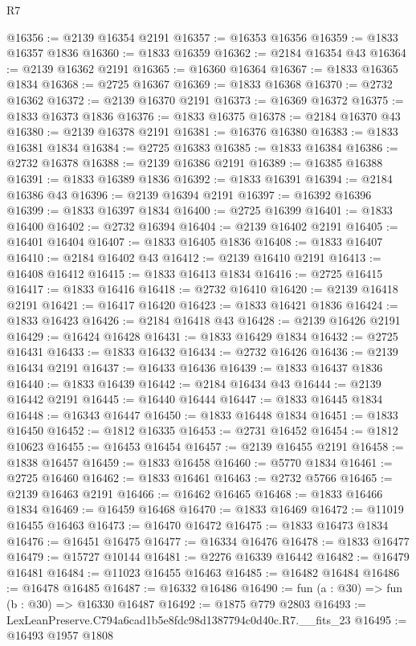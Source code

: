 \begin{lexlean}{R7}
\begin{coremodule}
@16356 := @2139 @16354 @2191
@16357 := @16353 @16356
@16359 := @1833 @16357 @1836
@16360 := @1833 @16359
@16362 := @2184 @16354 @43
@16364 := @2139 @16362 @2191
@16365 := @16360 @16364
@16367 := @1833 @16365 @1834
@16368 := @2725 @16367
@16369 := @1833 @16368
@16370 := @2732 @16362
@16372 := @2139 @16370 @2191
@16373 := @16369 @16372
@16375 := @1833 @16373 @1836
@16376 := @1833 @16375
@16378 := @2184 @16370 @43
@16380 := @2139 @16378 @2191
@16381 := @16376 @16380
@16383 := @1833 @16381 @1834
@16384 := @2725 @16383
@16385 := @1833 @16384
@16386 := @2732 @16378
@16388 := @2139 @16386 @2191
@16389 := @16385 @16388
@16391 := @1833 @16389 @1836
@16392 := @1833 @16391
@16394 := @2184 @16386 @43
@16396 := @2139 @16394 @2191
@16397 := @16392 @16396
@16399 := @1833 @16397 @1834
@16400 := @2725 @16399
@16401 := @1833 @16400
@16402 := @2732 @16394
@16404 := @2139 @16402 @2191
@16405 := @16401 @16404
@16407 := @1833 @16405 @1836
@16408 := @1833 @16407
@16410 := @2184 @16402 @43
@16412 := @2139 @16410 @2191
@16413 := @16408 @16412
@16415 := @1833 @16413 @1834
@16416 := @2725 @16415
@16417 := @1833 @16416
@16418 := @2732 @16410
@16420 := @2139 @16418 @2191
@16421 := @16417 @16420
@16423 := @1833 @16421 @1836
@16424 := @1833 @16423
@16426 := @2184 @16418 @43
@16428 := @2139 @16426 @2191
@16429 := @16424 @16428
@16431 := @1833 @16429 @1834
@16432 := @2725 @16431
@16433 := @1833 @16432
@16434 := @2732 @16426
@16436 := @2139 @16434 @2191
@16437 := @16433 @16436
@16439 := @1833 @16437 @1836
@16440 := @1833 @16439
@16442 := @2184 @16434 @43
@16444 := @2139 @16442 @2191
@16445 := @16440 @16444
@16447 := @1833 @16445 @1834
@16448 := @16343 @16447
@16450 := @1833 @16448 @1834
@16451 := @1833 @16450
@16452 := @1812 @16335
@16453 := @2731 @16452
@16454 := @1812 @10623
@16455 := @16453 @16454
@16457 := @2139 @16455 @2191
@16458 := @1838 @16457
@16459 := @1833 @16458
@16460 := @5770 @1834
@16461 := @2725 @16460
@16462 := @1833 @16461
@16463 := @2732 @5766
@16465 := @2139 @16463 @2191
@16466 := @16462 @16465
@16468 := @1833 @16466 @1834
@16469 := @16459 @16468
@16470 := @1833 @16469
@16472 := @11019 @16455 @16463
@16473 := @16470 @16472
@16475 := @1833 @16473 @1834
@16476 := @16451 @16475
@16477 := @16334 @16476
@16478 := @1833 @16477
@16479 := @15727 @10144
@16481 := @2276 @16339 @16442
@16482 := @16479 @16481
@16484 := @11023 @16455 @16463
@16485 := @16482 @16484
@16486 := @16478 @16485
@16487 := @16332 @16486
@16490 := fun (a : @30) => fun (b : @30) => @16330 @16487
@16492 := @1875 @779 @2803
@16493 := LexLeanPreserve.C794a6cad1b5e8fdc98d1387794c0d40c.R7.__fits_23
@16495 := @16493 @1957 @1808

\end{coremodule}
\end{lexlean}

